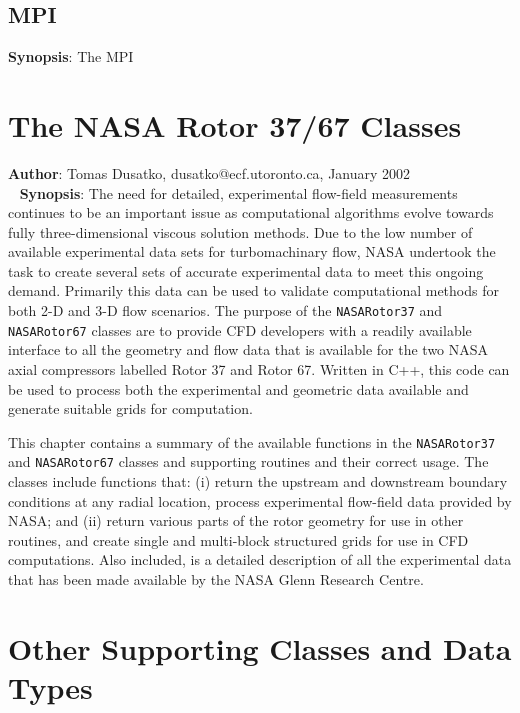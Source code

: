 \documentclass[11pt]{report}
\begin{document}
\section{MPI}

{\bf Synopsis}: The MPI

\chapter{The NASA Rotor 37/67 Classes}

{\bf Author}: Tomas Dusatko, dusatko@ecf.utoronto.ca, January 2002\\
\
\noindent
{\bf Synopsis}: The need for detailed, experimental 
flow-field measurements continues to be an important 
issue as computational algorithms evolve towards 
fully three-dimensional viscous solution methods. 
Due to the low number of available experimental data 
sets for turbomachinary flow, NASA undertook the task 
to create several sets of accurate experimental data 
to meet this ongoing demand. Primarily this data can 
be used to validate computational methods for both 2-D 
and 3-D flow scenarios. The purpose of the 
{\tt NASARotor37} and {\tt NASARotor67} classes
are to provide CFD developers with a readily available 
interface to all the geometry and flow data that is 
available for the two NASA axial compressors labelled 
Rotor 37 and Rotor 67. Written in C++, this code can be 
used to process both the experimental and geometric data 
available and generate suitable grids for computation.

This chapter contains a summary of 
the available functions in the {\tt NASARotor37} and 
{\tt NASARotor67} classes and supporting routines and 
their correct usage. The classes include functions that:
(i) return the upstream and downstream boundary conditions 
at any radial location, process experimental flow-field 
data provided by NASA; and (ii) return various parts of the 
rotor geometry for use in other routines, and create single 
and multi-block structured grids for use in CFD computations. 
Also included, is a detailed description of all the 
experimental data that has been made available by the NASA 
Glenn Research Centre.

\chapter{Other Supporting Classes and Data Types}
\end{document}
